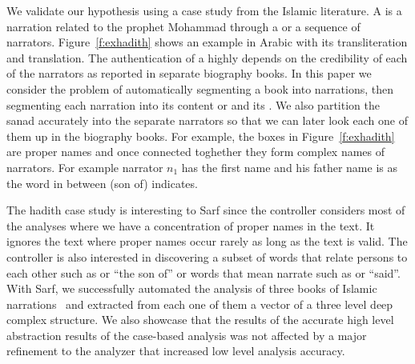 \documentclass[11pt]{article}
\newcommand{\noArRL}[1]{\arabfalse\RL{#1}\arabtrue}
\newcommand{\noTrRL}[1]{\transfalse\RL{#1}\transtrue}
\begin{document}
We validate our hypothesis using a case study from the Islamic 
literature. 
A  is a narration related to the prophet Mohammad
through a  or a sequence of narrators. 
Figure~\ref{f:exhadith} shows an example \noArRL{.hady_t} in Arabic with its 
transliteration and translation. 
The authentication of a \noArRL{.hady_t} highly depends on the credibility
of each of the narrators as reported in separate biography 
books. 
In this paper we consider the problem of automatically segmenting
a \noArRL{.hady_t} book into narrations, then segmenting each narration into
its content or  and its \noArRL{sanad}.
We also partition the sanad accurately into the 
separate narrators so that we can later look each one of them 
up in the biography books. 
For example, the boxes in Figure~\ref{f:exhadith} are proper names and once
connected toghether they form complex names of narrators. For example
narrator $n_1$ has the first name \noTrRL{qtybT} and his father name is
\noTrRL{s`yd} as the word in between \noTrRL{bn} (son of) indicates. 

The hadith case study is interesting to Sarf since the controller
considers most of the analyses where we have a concentration
of proper names in the text. It ignores the text where
proper names occur rarely as long 
as the text is valid.
The controller is also interested in discovering a subset of words 
that relate persons to each other such as  or ``the son of''
or words that mean narrate such as  or ``said''. 
With Sarf, we successfully automated the analysis of 
three books of Islamic narrations~\cite{IbnHanbal,AlTousi,AlKulayni}
and extracted from each one of them a vector of a three level deep
complex structure. 
We also showcase that the results of the accurate high level abstraction
results of the case-based analysis was not affected by a major
refinement to the analyzer that increased low level analysis accuracy. 

\end{document}
